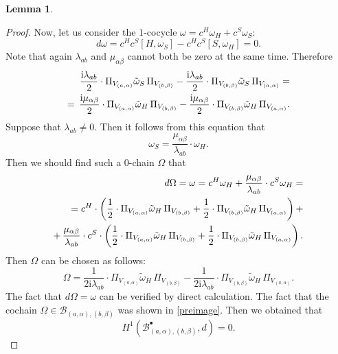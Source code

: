 \documentclass[10pt,a4paper]{amsart}
\theoremstyle{definition}
\newtheorem{lemma}[remark]{Lemma}
\begin{document}
\begin{lemma}
\begin{proof}
 Now, let us consider the $1$-cocycle $\omega=c^{H}\omega_{H}+c^{S}\omega_{S}$:
        \begin{equation}
            d\omega=c^{H}c^{S}[H,\omega_{S}]-c^{H}c^{S}[S,\omega_{H}]=0.
        \end{equation}
        Note that again $\lambda_{ab}$ and $\mu_{\alpha\beta}$ cannot both be zero at the same time. Therefore
        \begin{eqnarray}
            \notag\frac{\mathrm{i}\lambda_{ab}}{2}\cdot \Pi_{V_{(a,\alpha)}}\tilde{\omega}_{S}\,\Pi_{V_{(b,\beta)}}-\frac{\mathrm{i}\lambda_{ab}}{2}\cdot \Pi_{V_{(b,\beta)}}\tilde{\omega}_{S}\,\Pi_{V_{(a,\alpha)}}=\\=\,\frac{\mathrm{i}\mu_{\alpha\beta}}{2}\cdot \Pi_{V_{(a,\alpha)}}\tilde{\omega}_{H}\,\Pi_{V_{(b,\beta)}}-\frac{\mathrm{i}\mu_{\alpha\beta}}{2}\cdot \Pi_{V_{(b,\beta)}}\tilde{\omega}_{H}\,\Pi_{V_{(a,\alpha)}}.
        \end{eqnarray}
        Suppose that $\lambda_{ab}\neq 0$. Then it follows from this equation that 
        \begin{equation}
            \omega_{S}=\frac{\mu_{\alpha\beta}}{\lambda_{ab}}\cdot \omega_{H}.
        \end{equation}
        Then we should find such a $0$-chain $\Omega$ that
        \begin{eqnarray}
            \notag d\Omega=\omega=c^{H}\omega_{H}+\frac{\mu_{\alpha\beta}}{\lambda_{ab}}\cdot c^{S}\omega_{H}=\\\notag=c^{H}\cdot \left(\frac{1}{2}\cdot \Pi_{V_{(a,\alpha)}}\tilde{\omega}_{H}\,\Pi_{V_{(b,\beta)}}+\frac{1}{2}\cdot \Pi_{V_{(b,\beta)}}\tilde{\omega}_{H}\,\Pi_{V_{(a,\alpha)}}\right)+\\ +\,\frac{\mu_{\alpha\beta}}{\lambda_{ab}}\cdot c^{S}\cdot \left(\frac{1}{2}\cdot \Pi_{V_{(a,\alpha)}}\tilde{\omega}_{H}\,\Pi_{V_{(b,\beta)}}+\frac{1}{2}\cdot \Pi_{V_{(b,\beta)}}\tilde{\omega}_{H}\,\Pi_{V_{(a,\alpha)}}\right).
        \end{eqnarray}
        Then $\Omega$ can be chosen as follows:
        \begin{equation}
            \Omega = \frac{1}{2\mathrm{i}\lambda_{ab}}\cdot \Pi_{V_{(a,\alpha)}}\tilde{\omega}_{H}\,\Pi_{V_{(b,\beta)}}-\frac{1}{2\mathrm{i}\lambda_{ab}}\cdot \Pi_{V_{(b,\beta)}}\tilde{\omega}_{H}\,\Pi_{V_{(a,\alpha)}}.
        \end{equation}
        The fact that $d\Omega=\omega$ can be verified by direct calculation. The fact that the cochain $\Omega\in\mathcal{B}_{(a,\alpha),(b,\beta)}$ was shown in \eqref{preimage}. Then we obtained that
        \begin{equation}
        H^{1}(\mathcal{B}^{\bullet}_{(a,\alpha),(b,\beta)},d)=0.
        \end{equation}


\end{proof}
\end{lemma}
\end{document}
